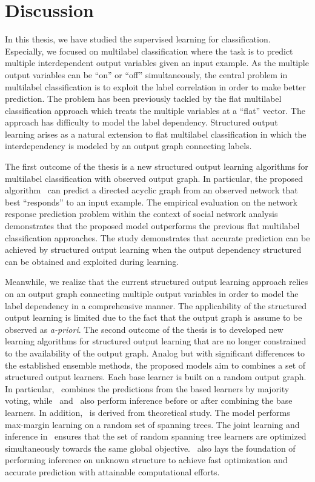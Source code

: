 {%
\section{Discussion}

In this thesis, we have studied the supervised learning for classification.
Especially, we focused on multilabel classification where the task is to predict multiple interdependent output variables given an input example.
As the multiple output variables can be ``on'' or ``off'' simultaneously, the central problem in multilabel classification is to exploit the label correlation in order to make better prediction.
The problem has been previously tackled by the flat multilabel classification approach which treats the multiple variables at a ``flat'' vector.
The approach has difficulty to model the label dependency.
Structured output learning arises as a natural extension to flat multilabel classification in which the interdependency is modeled by an output graph connecting labels.

The first outcome of the thesis is a new structured output learning algorithms for multilabel classification with observed output graph.
In particular, the proposed algorithm \spin\ can predict a directed acyclic graph from an observed network that best ``responds'' to an input example.
The empirical evaluation on the network response prediction problem within the context of social network analysis demonstrates that the proposed model outperforms the previous flat multilabel classification approaches.
The study demonstrates that accurate prediction can be achieved by structured output learning when the output dependency structured can be obtained and exploited during learning.

Meanwhile, we realize that the current structured output learning approach relies on an output graph connecting multiple output variables in order to model the label dependency in a comprehensive manner.
The applicability of the structured output learning is limited due to the fact that the output graph is assume to be observed as \textit{a-priori}.
The second outcome of the thesis is to developed new learning algorithms for structured output learning that are no longer constrained to the availability of the output graph.
Analog but with significant differences to the established ensemble methods, the proposed models aim to combines a set of structured output learners.
Each base learner is built on a random output graph.
In particular, \mve\ combines the predictions from the based learners by majority voting, while \amm\ and \mam\ also perform inference before or after combining the base learners.
In addition, \rta\ is derived from theoretical study.
The model performs max-margin learning on a random set of spanning trees.
The joint learning and inference in \rta\ ensures that the set of random spanning tree learners are optimized simultaneously towards the same global objective.
\rta\ also lays the foundation of performing inference on unknown structure to achieve fast optimization and accurate prediction with attainable computational efforts.

}
